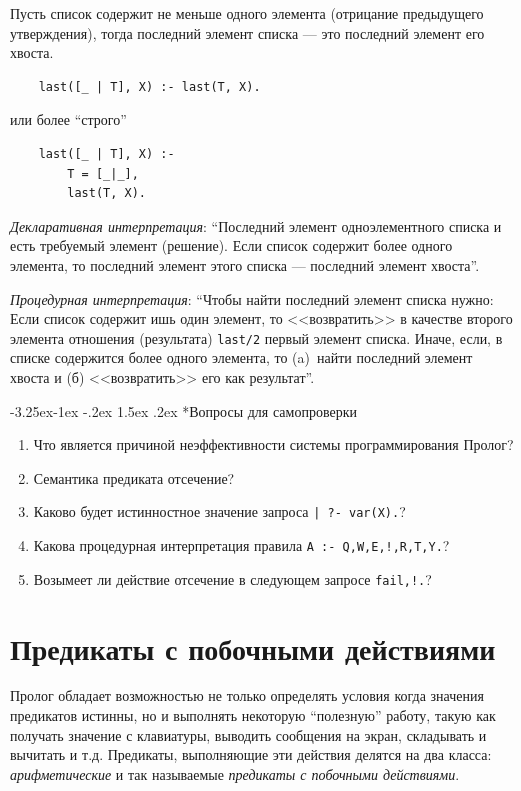 \documentclass[12pt, openany, twoside]{book} %
\makeatletter
\renewcommand\subsubsection{\@startsection{subsubsection}{3}{\z@}%
                                     {-3.25ex\@plus -1ex \@minus -.2ex}%
                                     {1.5ex \@plus .2ex}%
                                     {\normalfont\normalsize\bfseries}}
\newenvironment{questions}{\subsubsection*{Вопросы для самопроверки}\begin{enumerate}}{\end{enumerate}}
\makeatother
\begin{document}
Пусть список содержит не меньше одного элемента (отрицание предыдущего утверждения), тогда последний элемент списка --- это последний элемент его хвоста.

{\tt\begin{verbatim}
    last([_ | T], X) :- last(T, X).
\end{verbatim}}
\noindent или более ``строго''
{\tt\begin{verbatim}
    last([_ | T], X) :-
        T = [_|_],
        last(T, X).
\end{verbatim}}\emph{Декларативная интерпретация}: ``Последний элемент одноэлементного списка и есть требуемый элемент (решение). Если список содержит более одного элемента, то последний элемент этого списка --- последний элемент хвоста''.

\emph{Процедурная интерпретация}: ``Чтобы найти последний элемент списка нужно: Если список содержит ишь один элемент, то <<возвратить>> в качестве второго элемента отношения (результата) {\tt last/2} первый элемент списка. Иначе, если, в списке содержится более одного элемента, то (a)~найти последний элемент хвоста и (б) <<возвратить>> его как результат''.

\begin{questions}
\item{} Что является причиной неэффективности системы программирования Пролог?
\item{} Семантика предиката отсечение?
\item{} Каково будет истинностное значение запроса \texttt{| ?- var(X).}?
\item{} Какова процедурная интерпретация правила \texttt{A :- Q,W,E,!,R,T,Y.}?
\item{} Возымеет ли действие отсечение в следующем запросе \texttt{fail,!.}?
\end{questions}

\chapter{Предикаты с побочными действиями}
Пролог обладает возможностью не только определять условия когда значения предикатов истинны, но и выполнять некоторую ``полезную'' работу, такую как получать значение с клавиатуры, выводить сообщения на экран, складывать и вычитать и т.д. Предикаты, выполняющие эти действия делятся на два класса: {\em арифметические} и так называемые {\em предикаты с побочными действиями}.
\end{document}
